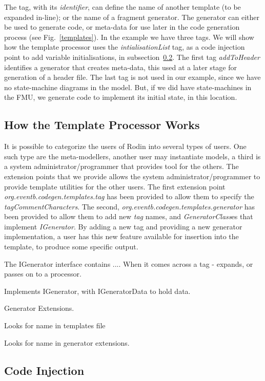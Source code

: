 \documentclass{llncs}%
\begin{document}
The tag, with its \emph{identifier}, can define the name of another template (to be expanded in-line); or the name of a fragment generator. The generator can either be used to generate code, or meta-data for use later in the code generation process  (see Fig.~\ref{templates}). In the example we have three tags. We will show how the template processor uses the \emph{intialisationList} tag, as a code injection point to add variable initialisations, in subsection~\ref{injection}. The first tag \emph{addToHeader} identifies a generator that creates meta-data, this used at a later stage for generation of a header file. The last tag is not used in our example, since we have no state-machine diagrams in the model. But, if we did have state-machines in the FMU, we generate code to implement its initial state, in this location.
%
\subsection{How the Template Processor Works}
It is possible to categorize the users of Rodin into several types of users. One such type are the meta-modellers, another user may instantiate models, a third is a system administrator/programmer that provides tool for the others. The extension points that we provide allows the system administrator/programmer to provide template utilities for the other users.  The first extension point \\ \emph{org.eventb.codegen.templates.tag} has been provided to allow them to specify the \emph{tagCommentCharacters}. The second, \emph{org.eventb.codegen.templates.generator} has been provided to allow them to add new \emph{tag} names, and \emph{GeneratorClass}es that implement \emph{IGenerator}. By adding a new tag and providing a new generator implementation, a user has this new feature available for insertion into the template, to produce some specific output. 

The IGenerator interface contains .... 
When it comes across a tag - expands, or passes on to a processor.

Implements IGenerator, with IGeneratorData to hold data.

Generator Extensions.

Looks for name in templates file

Looks for name in generator extensions.


\subsection{Code Injection} \label{injection}
\end{document}
